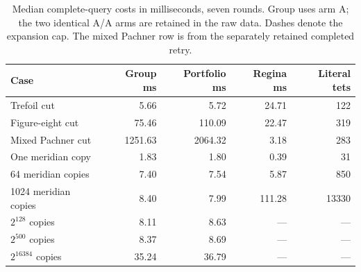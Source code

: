 \begin{table}[htbp]
\centering\small
\begin{tabular}{lrrrr}
\toprule
Case & Group ms & Portfolio ms & Regina ms & Literal tets \\
\midrule
Trefoil cut & 5.66 & 5.72 & 24.71 & 122 \\
Figure-eight cut & 75.46 & 110.09 & 22.47 & 319 \\
Mixed Pachner cut & 1251.63 & 2064.32 & 3.18 & 283 \\
One meridian copy & 1.83 & 1.80 & 0.39 & 31 \\
64 meridian copies & 7.40 & 7.54 & 5.87 & 850 \\
1024 meridian copies & 8.40 & 7.99 & 111.28 & 13330 \\
$2^{128}$ copies & 8.11 & 8.63 & --- & --- \\
$2^{500}$ copies & 8.37 & 8.69 & --- & --- \\
$2^{16384}$ copies & 35.24 & 36.79 & --- & --- \\
\bottomrule
\end{tabular}
\caption{Median complete-query costs in milliseconds, seven rounds. Group uses arm A; the two identical A/A arms are retained in the raw data. Dashes denote the expansion cap. The mixed Pachner row is from the separately retained completed retry.}
\label{tab:timings}
\end{table}
